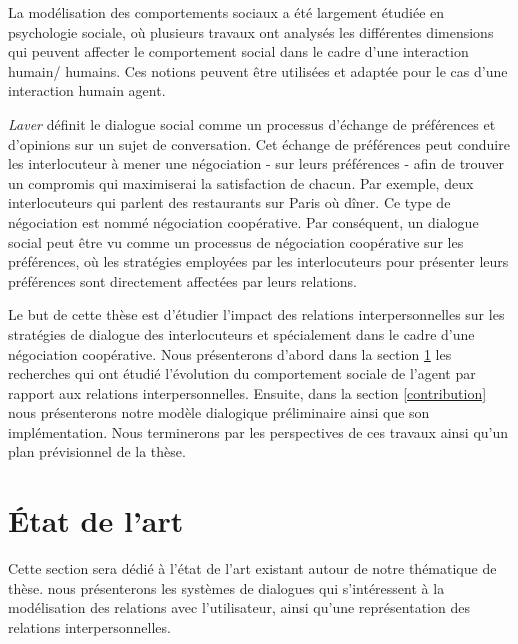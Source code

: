 \documentclass[a4paper,french]{article}
\begin{document}
\par La modélisation des comportements sociaux a été largement étudiée en psychologie sociale, où plusieurs travaux ont analysés les différentes dimensions qui peuvent affecter le comportement social dans le cadre d’une interaction humain/ humains. Ces notions peuvent être utilisées et adaptée pour le cas d’une interaction humain agent.
 \par \emph{Laver}\cite{laver1981linguistic} définit le dialogue social comme un processus d'échange de préférences et d'opinions sur un sujet de conversation. Cet échange de préférences peut conduire les interlocuteur à mener une négociation - sur leurs préférences - afin de trouver un compromis qui maximiserai la satisfaction de chacun. Par exemple, deux interlocuteurs qui parlent des restaurants sur Paris où dîner.  
 Ce type de négociation est nommé négociation coopérative. Par conséquent, un dialogue social peut être vu comme un processus de négociation coopérative sur les préférences, où les stratégies employées par les interlocuteurs pour présenter leurs préférences sont directement affectées par leurs relations.

\par Le but de cette thèse est d'étudier l'impact des relations interpersonnelles sur les stratégies de dialogue des interlocuteurs et spécialement dans le cadre d'une négociation coopérative. Nous présenterons d'abord dans la section \ref{RW} les recherches qui ont étudié l'évolution du comportement sociale de l'agent par rapport aux relations interpersonnelles. Ensuite, dans la section \ref{contribution} nous présenterons notre modèle dialogique préliminaire ainsi que son implémentation. Nous terminerons par les perspectives de ces travaux ainsi qu'un plan prévisionnel de la thèse.

\section{État de l'art}
\label{RW}
Cette section sera dédié à l'état de l'art existant autour de notre thématique de thèse. nous présenterons les systèmes de dialogues qui s'intéressent à la modélisation des relations avec l'utilisateur, ainsi qu'une représentation des relations interpersonnelles.  
\end{document}
